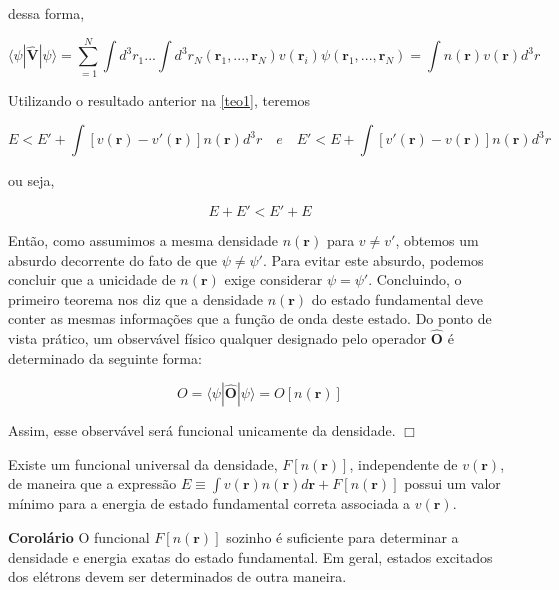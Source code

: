 		dessa forma, 
		
		\begin{equation}
			\langle \psi | \hat{\textbf{V}} | \psi \rangle = \sum_{=1}^{N} \int d^3 r_1 ... \int d^3 r_N (\textbf{r}_1, ..., \textbf{r}_N)v(\textbf{r}_i)\psi(\textbf{r}_1, ..., \textbf{r}_N) = \int n(\textbf{r})v(\textbf{r})d^3r
		\end{equation}
	
		Utilizando o resultado anterior na \autoref{teo1}, teremos
		
		\begin{equation}
			E < E' + \int [v(\textbf{r}) - v'(\textbf{r})]n(\textbf{r})d^3r \quad e \quad 	E' < E + \int [v'(\textbf{r}) - v(\textbf{r})]n(\textbf{r})d^3r
		\end{equation}
		
		ou seja, 
		
		\begin{equation}
			E + E' < E' + E
		\end{equation}
		
		Então, como assumimos a mesma densidade $n(\textbf{r})$ para $v\neq v'$, obtemos um absurdo decorrente do fato de que $\psi \neq \psi '$. Para evitar este absurdo, podemos concluir que a unicidade de $n(\textbf{r})$ exige considerar $\psi = \psi '$. Concluindo, o primeiro teorema nos diz que a densidade $n(\textbf{r})$ do estado fundamental deve conter as mesmas informações que a função de onda deste estado. Do ponto de vista prático, um observável físico qualquer designado pelo operador $\hat{\textbf{O}}$ é determinado da seguinte forma:
		
		\begin{equation}
			O = \langle \psi | \hat{\textbf{O}} | \psi \rangle = O[n(\textbf{r})]
		\end{equation}
		
		Assim, esse observável será funcional unicamente da densidade. $\Box$
		
		\begin{DFT}
			\label{teohk2}
			Existe um funcional universal da densidade, $F[n(\textbf{r})]$, independente de $v(\textbf{r})$, de maneira que a expressão $E \equiv \int v(\textbf{r}) n(\textbf{r}) d\textbf{r} + F[n(\textbf{r})] $ possui um valor mínimo para a energia de estado fundamental correta associada a $v(\textbf{r})$.
		\end{DFT}
		\textbf{Corolário} O funcional $F[n(\textbf{r})]$ sozinho é suficiente para determinar a densidade e energia exatas do estado fundamental. Em geral, estados excitados dos elétrons devem ser determinados de outra maneira. 
	
